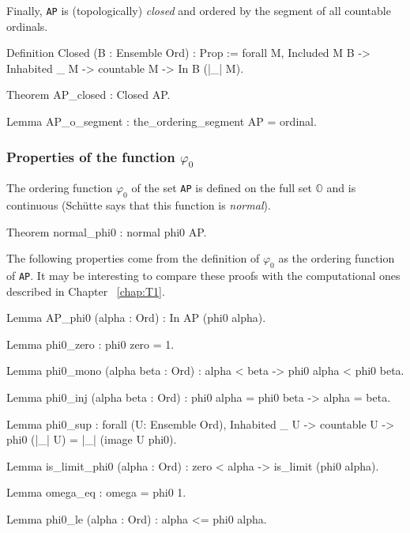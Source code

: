 \documentclass[a4paper]{book}
\begin{document}
{Finally, \texttt{AP} is (topologically) \emph{closed} and ordered by the segment of all countable ordinals.


\begin{Coqsrc} 
Definition Closed (B : Ensemble Ord) : Prop := 
  forall M, Included M B -> Inhabited _ M -> 
                 countable M -> In B (|_| M).
\end{Coqsrc}

\begin{Coqsrc}
Theorem AP_closed : Closed AP.

Lemma AP_o_segment :  the_ordering_segment AP = ordinal.
\end{Coqsrc}

\subsubsection{Properties of the function \texorpdfstring{$\varphi_0$}{phi0}}
 
The ordering function $\varphi_0$ of the set \texttt{AP} is defined on the full set $\mathbb{O}$ and is continuous (Schütte says that this function is \emph{normal}).

\begin{Coqsrc}
Theorem normal_phi0 : normal phi0 AP.
\end{Coqsrc}

The following properties come from  the definition of $\varphi_0$ as the ordering function of \texttt{AP}. It may be interesting to compare these proofs with the computational ones described in Chapter ~\ref{chap:T1}.

\begin{Coqsrc}
Lemma AP_phi0 (alpha : Ord) : In AP (phi0 alpha).

Lemma phi0_zero : phi0 zero =  1.

Lemma phi0_mono (alpha beta : Ord) :
  alpha < beta ->  phi0 alpha < phi0 beta.

Lemma phi0_inj (alpha beta : Ord) :
    phi0 alpha = phi0 beta -> alpha = beta.

Lemma phi0_sup : forall (U: Ensemble Ord),
   Inhabited _ U ->   countable U ->  phi0 (|_| U) = |_| (image U phi0).

Lemma is_limit_phi0 (alpha : Ord) :
  zero < alpha ->  is_limit (phi0 alpha).

Lemma omega_eq : omega = phi0 1. 

Lemma phi0_le (alpha : Ord) : alpha <= phi0 alpha.
\end{Coqsrc}

}
\end{document}
